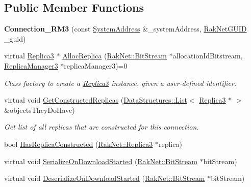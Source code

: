 \subsection*{Public Member Functions}
\begin{DoxyCompactItemize}
\item 
\hypertarget{class_rak_net_1_1_connection___r_m3_a89b898a0bebe8c44cd961332523d744c}{{\bfseries Connection\-\_\-\-R\-M3} (const \hyperlink{struct_rak_net_1_1_system_address}{System\-Address} \&\-\_\-system\-Address, \hyperlink{struct_rak_net_1_1_rak_net_g_u_i_d}{Rak\-Net\-G\-U\-I\-D} \-\_\-guid)}\label{class_rak_net_1_1_connection___r_m3_a89b898a0bebe8c44cd961332523d744c}

\item 
virtual \hyperlink{class_rak_net_1_1_replica3}{Replica3} $\ast$ \hyperlink{class_rak_net_1_1_connection___r_m3_ab05d85100f726378f2ed73c6792a5b46}{Alloc\-Replica} (\hyperlink{class_rak_net_1_1_bit_stream}{Rak\-Net\-::\-Bit\-Stream} $\ast$allocation\-Id\-Bitstream, \hyperlink{class_rak_net_1_1_replica_manager3}{Replica\-Manager3} $\ast$replica\-Manager3)=0
\begin{DoxyCompactList}\small\item\em Class factory to create a \hyperlink{class_rak_net_1_1_replica3}{Replica3} instance, given a user-\/defined identifier. \end{DoxyCompactList}\item 
virtual void \hyperlink{class_rak_net_1_1_connection___r_m3_a8c14767a72a11032176b8d5ef513a798}{Get\-Constructed\-Replicas} (\hyperlink{class_data_structures_1_1_list}{Data\-Structures\-::\-List}$<$ \hyperlink{class_rak_net_1_1_replica3}{Replica3} $\ast$ $>$ \&objects\-They\-Do\-Have)
\begin{DoxyCompactList}\small\item\em Get list of all replicas that are constructed for this connection. \end{DoxyCompactList}\item 
bool \hyperlink{class_rak_net_1_1_connection___r_m3_a1b05a20c8a6ceabb86c08bc175c7906d}{Has\-Replica\-Constructed} (\hyperlink{class_rak_net_1_1_replica3}{Rak\-Net\-::\-Replica3} $\ast$replica)
\item 
virtual void \hyperlink{class_rak_net_1_1_connection___r_m3_ad3661c8e40c359fc54bdc2066acb8dba}{Serialize\-On\-Download\-Started} (\hyperlink{class_rak_net_1_1_bit_stream}{Rak\-Net\-::\-Bit\-Stream} $\ast$bit\-Stream)
\item 
virtual void \hyperlink{class_rak_net_1_1_connection___r_m3_acf23e94dddb214cf0d631fe074cd4467}{Deserialize\-On\-Download\-Started} (\hyperlink{class_rak_net_1_1_bit_stream}{Rak\-Net\-::\-Bit\-Stream} $\ast$bit\-Stream)

\end{DoxyCompactItemize}
